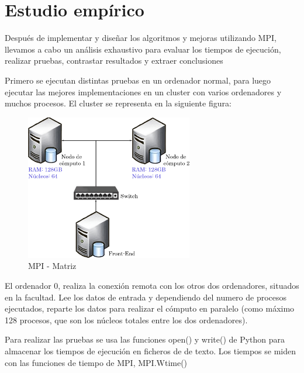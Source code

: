 


\chapter{Estudio empírico}
\label{cap:c4_estudio}	
Después de implementar y diseñar los algoritmos y mejoras utilizando MPI, llevamos a cabo un análisis exhaustivo para evaluar los tiempos de ejecución, realizar pruebas, contrastar resultados y extraer conclusiones

Primero se ejecutan distintas pruebas en un ordenador normal, para luego ejecutar las mejores implementaciones en un cluster con varios ordenadores y muchos procesos. El cluster se representa en la siguiente figura:


\begin{figure}[!h]
	\centering
	\includegraphics[width=0.65\textwidth]{images/chapter_4/cluster}
	\caption{MPI - Matriz}
	\label{fig:cluster}
\end{figure}


\newpage

El ordenador 0, realiza la conexión remota con los otros dos ordenadores, situados en la facultad. Lee los datos de entrada y dependiendo del numero de procesos ejecutados, reparte los datos para realizar el cómputo en paralelo (como máximo 128 procesos, que son los núcleos totales entre los dos ordenadores). 

Para realizar las pruebas se usa las funciones open() y write() de Python para almacenar los tiempos de ejecución en ficheros de de texto. Los tiempos se miden con las funciones de
tiempo de MPI, MPI.Wtime()

